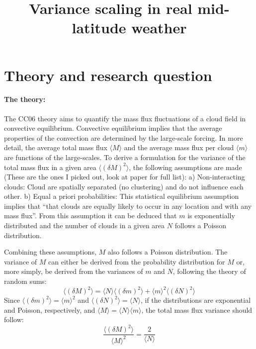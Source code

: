 \documentclass[a4paper, 12pt]{article}
\title{Variance scaling in real mid-latitude weather}
\begin{document}
\maketitle
	
\section{Theory and research question}

\paragraph{The \cite{Craig2006} theory:} The CC06 theory aims to quantify the mass flux fluctuations of a cloud field in convective equilibrium. Convective equilibrium implies that the average properties of the convection are determined by the large-scale forcing. In more detail, the average total mass flux $\langle M \rangle$ and the average mass flux per cloud $\langle m \rangle$ are functions of the large-scales. To derive a formulation for the variance of the total mass flux in a given area $\langle (\delta M)^2 \rangle$, the following assumptions are made (These are the ones I picked out, look at paper for full list): a) Non-interacting clouds: Cloud are spatially separated (no clustering) and do not influence each other. b) Equal a priori probabilities: This statistical equilibrium assumption implies that ``that clouds are equally likely to occur in any location and with any mass flux''. From this assumption it can be deduced that $m$ is exponentially distributed and the number of clouds in a given area $N$ follows a Poisson distribution. 

Combining these assumptions, $M$ also follows a Poisson distribution. The variance of $M$ can either be derived from the probability distribution for $M$ or, more simply, be derived from the variances of $m$ and $N$, following the theory of random sums: 
\begin{equation}
\langle (\delta M)^2 \rangle=\langle N \rangle \langle (\delta m)^2 \rangle + \langle m \rangle^2 \langle (\delta N)^2 \rangle
\end{equation} 
Since $\langle (\delta m)^2 \rangle = \langle m \rangle^2$ and $\langle (\delta N)^2 \rangle = \langle N \rangle$, if the distributions are exponential and Poisson, respectively, and $\langle M \rangle=\langle N \rangle \langle m \rangle$, the total mass flux variance should follow:
\begin{equation}
\frac{\langle (\delta M)^2 \rangle}{\langle M \rangle^2} = \frac{2}{\langle N \rangle}
\end{equation} 
\end{document}
